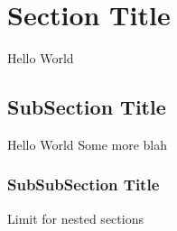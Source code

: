 \section{Section Title}
Hello World \cite{ref1}
\subsection{SubSection Title}
Hello World \cite{ref2}
\newpage
Some more blah
\subsubsection{SubSubSection Title}
Limit for nested sections \cite{ref3} 